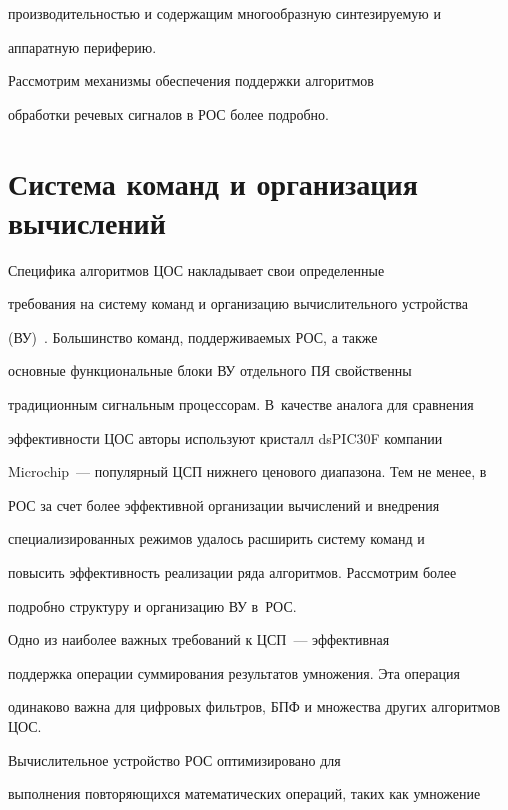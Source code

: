 производительностью и содержащим многообразную синтезируемую и 


аппаратную периферию. 


      


      Рассмотрим механизмы обеспечения поддержки алгоритмов 


обработки речевых сигналов в РОС более подробно.





\section{Система команд и организация вычислений}


      


      Специфика алгоритмов ЦОС накладывает свои определенные 


требования на систему команд и организацию вычислительного устройства 


(ВУ)~\cite{3-3}. Большинство команд, поддерживаемых РОС, а также 


основные функциональные блоки ВУ отдельного ПЯ свойственны 


традиционным сигнальным процессорам. В~качестве аналога для сравнения 


эффективности ЦОС авторы используют кристалл dsPIC30F компании 


Microchip~--- популярный ЦСП нижнего ценового диапазона. Тем не менее, в 


РОС за счет более эффективной организации вычислений и внедрения 


специализированных режимов удалось расширить систему команд и 


повысить эффективность реализации ряда алгоритмов. Рассмотрим более 


подробно структуру и организацию ВУ в~РОС.


      


      Одно из наиболее важных требований к ЦСП~--- эффективная 


поддержка операции суммирования результатов умножения. Эта операция 


одинаково важна для цифровых фильт\-ров, БПФ и множества других алгоритмов ЦОС. 


Вычислительное устройство РОС оптимизировано для 


выполнения повторяющихся математических операций, таких как умножение 


